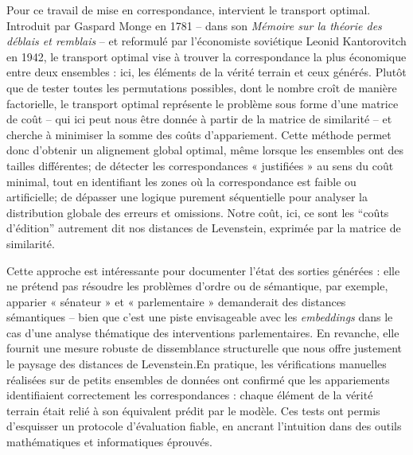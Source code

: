 Pour ce travail de mise en correspondance, intervient le transport optimal. Introduit par Gaspard Monge en 1781 -- dans son \emph{Mémoire sur la théorie des déblais et remblais} -- et reformulé par l'économiste soviétique Leonid Kantorovitch en 1942, le transport optimal vise à trouver la correspondance la plus économique entre deux ensembles : ici, les éléments de la vérité terrain et ceux générés. Plutôt que de tester toutes les permutations possibles, dont le nombre croît de manière factorielle, le transport optimal représente le problème sous forme d’une matrice de coût -- qui ici peut nous être donnée à partir de la matrice de similarité -- et cherche à minimiser la somme des coûts d’appariement. Cette méthode permet donc d’obtenir un alignement global optimal, même lorsque les ensembles ont des tailles différentes; de détecter les correspondances « justifiées » au sens du coût minimal, tout en identifiant les zones où la correspondance est faible ou artificielle; de dépasser une logique purement séquentielle pour analyser la distribution globale des erreurs et omissions. Notre coût, ici, ce sont les \enquote{coûts d'édition} autrement dit nos distances de Levenstein, exprimée par la matrice de similarité.

Cette approche est intéressante pour documenter l’état des sorties générées : elle ne prétend pas résoudre les problèmes d’ordre ou de sémantique, par exemple, apparier « sénateur » et « parlementaire » demanderait des distances sémantiques -- bien que c'est une piste envisageable avec les \emph{embeddings} dans le cas d'une analyse thématique des interventions parlementaires. En revanche, elle fournit une mesure robuste de dissemblance structurelle que nous offre justement le paysage des distances de Levenstein.En pratique, les vérifications manuelles réalisées sur de petits ensembles de données ont confirmé que les appariements identifiaient correctement les correspondances : chaque élément de la vérité terrain était relié à son équivalent prédit par le modèle. Ces tests ont permis d’esquisser un protocole d’évaluation fiable, en ancrant l’intuition dans des outils mathématiques et informatiques éprouvés.

